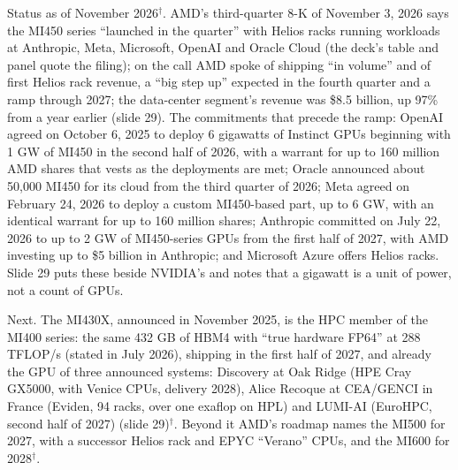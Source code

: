 \documentclass[11pt,letterpaper]{article}
\begin{document}
Status as of November 2026$^\dagger$. AMD's third-quarter 8-K of November 3, 2026 says the MI450 series ``launched in the quarter'' with Helios racks running workloads at Anthropic, Meta, Microsoft, OpenAI and Oracle Cloud (the deck's table and panel quote the filing); on the call AMD spoke of shipping ``in volume'' and of first Helios rack revenue, a ``big step up'' expected in the fourth quarter and a ramp through 2027; the data-center segment's revenue was \$8.5 billion, up 97\% from a year earlier (slide 29). The commitments that precede the ramp: OpenAI agreed on October 6, 2025 to deploy 6 gigawatts of Instinct GPUs beginning with 1 GW of MI450 in the second half of 2026, with a warrant for up to 160 million AMD shares that vests as the deployments are met; Oracle announced about 50{,}000 MI450 for its cloud from the third quarter of 2026; Meta agreed on February 24, 2026 to deploy a custom MI450-based part, up to 6 GW, with an identical warrant for up to 160 million shares; Anthropic committed on July 22, 2026 to up to 2 GW of MI450-series GPUs from the first half of 2027, with AMD investing up to \$5 billion in Anthropic; and Microsoft Azure offers Helios racks. Slide 29 puts these beside NVIDIA's and notes that a gigawatt is a unit of power, not a count of GPUs.

Next. The MI430X, announced in November 2025, is the HPC member of the MI400 series: the same 432 GB of HBM4 with ``true hardware FP64'' at 288 TFLOP/s (stated in July 2026), shipping in the first half of 2027, and already the GPU of three announced systems: Discovery at Oak Ridge (HPE Cray GX5000, with Venice CPUs, delivery 2028), Alice Recoque at CEA/GENCI in France (Eviden, 94 racks, over one exaflop on HPL) and LUMI-AI (EuroHPC, second half of 2027) (slide 29)$^\dagger$. Beyond it AMD's roadmap names the MI500 for 2027, with a successor Helios rack and EPYC ``Verano'' CPUs, and the MI600 for 2028$^\dagger$.
\end{document}
